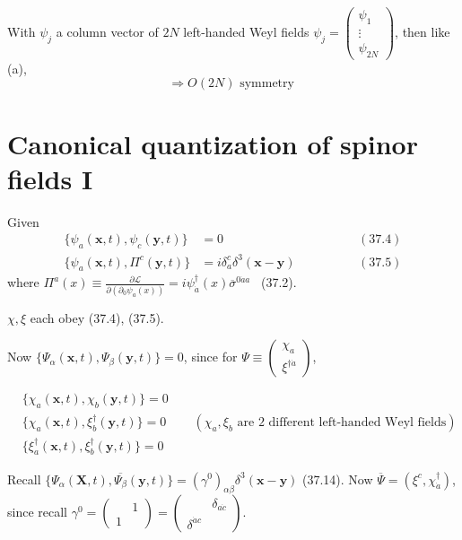 \documentclass[twoside]{amsart}
\newcommand{\solutionhead}[1]
  {\smallskip
   \noindent{\large\bf Solution #1.}
   }
\begin{document}
\begin{itemize}
With $\psi_j$ a column vector of $2N$ left-handed Weyl fields $\psi_j = \left( \begin{matrix} \psi_1 \\ \vdots \\ \psi_{2N} \end{matrix} \right)$, then like (a), 
\[
\Longrightarrow \boxed{ O(2N) \text{ symmetry } }
\]
\end{itemize}




\section{ Canonical quantization of spinor fields I }

\solutionhead{37.1} Given
\[
\begin{aligned}
  \lbrace \psi_a(\mathbf{x},t) , \psi_c(\mathbf{y}, t) \rbrace & = 0  \quad \quad \quad \quad \, & (37.4) \\
  \lbrace \psi_a(\mathbf{x},t) , \Pi^c(\mathbf{y}, t) \rbrace & = i \delta_a^c \delta^3(\mathbf{x} - \mathbf{y} )  \quad \quad \quad \quad \, & (37.5)
\end{aligned}
\]
where $\Pi^a(x) \equiv \frac{ \partial \mathcal{L} }{ \partial ( \partial_0 \psi_a(x)) } = i \psi_{\dot{a}}^{\dag}(x) \overline{\sigma}^{ 0 \dot{a} a}$ \quad \, (37.2).  

$\chi, \xi$ each obey (37.4), (37.5).  

Now $\lbrace \Psi_{\alpha}(\mathbf{x},t), \Psi_{\beta}(\mathbf{y},t) \rbrace =0$, since for $\Psi \equiv \left( \begin{matrix} \chi_a \\ \xi^{\dag \dot{a}} \end{matrix} \right)$,  

\[
\begin{aligned}
  & \lbrace \chi_a(\mathbf{x},t) , \chi_b(\mathbf{y},t) \rbrace = 0 \\ 
  & \lbrace \chi_a(\mathbf{x},t) , \xi_b^{\dag}(\mathbf{y},t)  \rbrace =  0  \quad \quad \, (\chi_a, \xi_b \text{ are 2 different left-handed Weyl fields}) \\
  & \lbrace \xi_a^{\dag}(\mathbf{x},t) , \xi_b^{\dag}(\mathbf{y},t) \rbrace = 0 
\end{aligned}
\]

Recall $\lbrace \Psi_{\alpha}(\mathbf{X},t), \overline{\Psi_{\beta}}(\mathbf{y},t) \rbrace = ( \gamma^0)_{\alpha \beta} \delta^3(\mathbf{x} - \mathbf{y})$ (37.14).  Now $\overline{\Psi} = (\xi^c, \chi_{\dot{a}}^{\dag} )$, since recall $\gamma^0 = \left( \begin{matrix} & 1 \\ 1 & \end{matrix} \right) =  \left( \begin{matrix} & \delta_{a\dot{c}} \\ \delta^{\dot{a}c} & \end{matrix} \right)$.  
\end{document}
